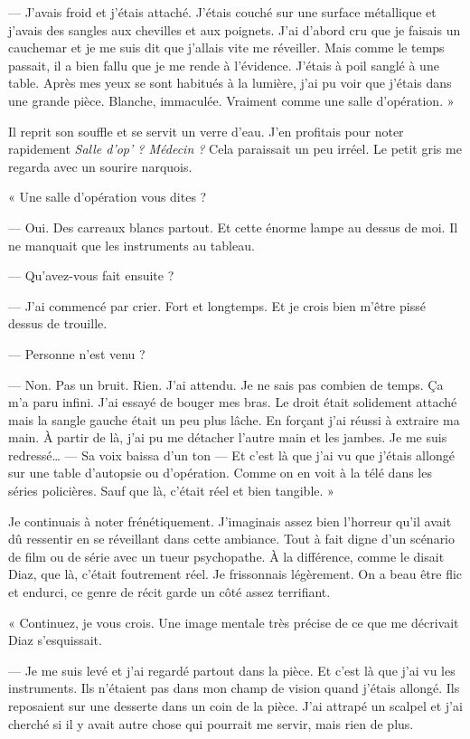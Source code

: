 — J'avais froid et j'étais attaché. J'étais couché sur une surface métallique et j'avais des sangles aux chevilles et
aux poignets. J'ai d'abord cru que je faisais un cauchemar et je me suis dit que j'allais vite me réveiller. Mais comme
le temps passait, il a bien fallu que je me rende à l'évidence. J'étais à poil sanglé à une table. Après mes yeux se
sont habitués à la lumière, j'ai pu voir que j'étais dans une grande pièce. Blanche, immaculée. Vraiment comme une
salle d'opération. »

Il reprit son souffle et se servit un verre d'eau. J'en profitais pour noter rapidement \emph{Salle d'op' ? Médecin ?}
Cela paraissait un peu irréel. Le petit gris me regarda avec un sourire narquois.

« Une salle d'opération vous dites ?

— Oui. Des carreaux blancs partout. Et cette énorme lampe au dessus de moi. Il ne manquait que les instruments au
tableau.

— Qu'avez-vous fait ensuite ?

— J'ai commencé par crier. Fort et longtemps. Et je crois bien m'être pissé dessus de trouille.

— Personne n'est venu ?

— Non. Pas un bruit. Rien. J'ai attendu. Je ne sais pas combien de temps. Ça m'a paru infini. J'ai essayé de bouger mes
bras. Le droit était solidement attaché mais la sangle gauche était un peu plus lâche. En forçant j'ai réussi à
extraire ma main. À partir de là, j'ai pu me détacher l'autre main et les jambes. Je me suis redressé… — Sa voix baissa
d'un ton — Et c'est là que j'ai vu que j'étais allongé sur une table d'autopsie ou d'opération. Comme on en voit à la
télé dans les séries policières. Sauf que là, c'était réel et bien tangible. »

Je continuais à noter frénétiquement. J'imaginais assez bien l'horreur qu'il avait dû ressentir en se réveillant dans
cette ambiance. Tout à fait digne d'un scénario de film ou de série avec un tueur psychopathe. À la différence, comme
le disait Diaz, que là, c'était foutrement réel. Je frissonnais légèrement. On a beau être flic et endurci, ce genre de
récit garde un côté assez terrifiant.

« Continuez, je vous crois. Une image mentale très précise de ce que me décrivait Diaz s'esquissait.

— Je me suis levé et j'ai regardé partout dans la pièce. Et c'est là que j'ai vu les instruments. Ils n'étaient pas
dans mon champ de vision quand j'étais allongé. Ils reposaient sur une desserte dans un coin de la pièce. J'ai attrapé
un scalpel et j'ai cherché si il y avait autre chose qui pourrait me servir, mais rien de plus.

